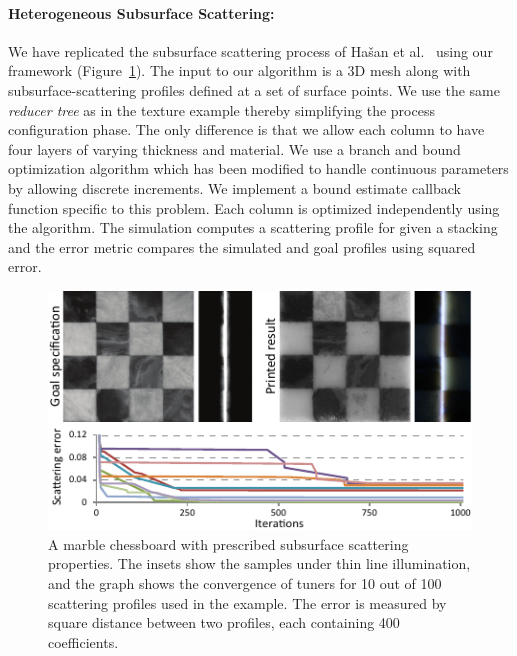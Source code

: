 \paragraph{Heterogeneous Subsurface Scattering:}
We have replicated the subsurface scattering process of Ha\v{s}an et al.~ using our framework (Figure~\ref{fig:sub}).
The input to our algorithm is a 3D mesh along with subsurface-scattering profiles defined at a set of surface points. We use the same \emph{reducer tree} as in the texture example thereby simplifying the process configuration phase.
The only difference is that we allow each column to have four layers of varying thickness and material. We use a branch and bound optimization algorithm which has been modified to handle continuous parameters by allowing discrete increments. We implement a bound estimate callback function specific to this problem.
Each column is optimized independently using the algorithm. The simulation computes a scattering profile for given a stacking and the error metric compares the simulated and goal profiles using squared error.

\begin{figure}
\centering
\includegraphics[width=0.65\linewidth]{figure/fig_chess.pdf}
\caption{
	A marble chessboard with prescribed subsurface scattering properties.
	The insets show the samples under thin line illumination, and the graph shows the convergence of tuners for 10 out of 100 scattering profiles used in the example. The error is measured by square distance between two profiles, each containing 400 coefficients.}
\label{fig:sub}
\end{figure}

